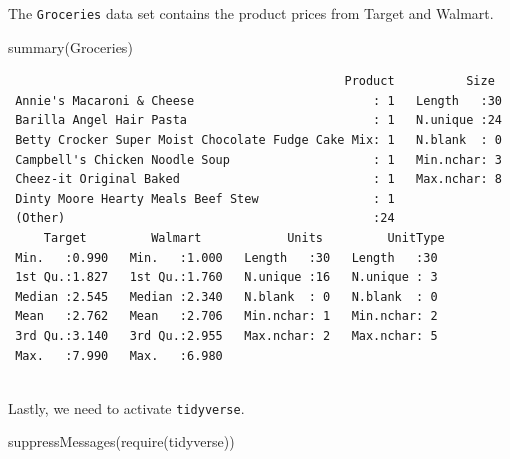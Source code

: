 \documentclass[
  letterpaper,
  DIV=11,
  numbers=noendperiod]{scrreprt}
\newenvironment{Shaded}{\begin{snugshade}}{\end{snugshade}}
\newcommand{\FunctionTok}[1]{\textcolor[rgb]{0.28,0.35,0.67}{#1}}
\newcommand{\NormalTok}[1]{\textcolor[rgb]{0.00,0.23,0.31}{#1}}
\newcommand{\OtherTok}[1]{\textcolor[rgb]{0.00,0.23,0.31}{#1}}
\newcommand{\SpecialCharTok}[1]{\textcolor[rgb]{0.37,0.37,0.37}{#1}}
\begin{document}
\begin{Shaded}
\end{Shaded}

The \texttt{Groceries} data set contains the product prices from Target
and Walmart.

\begin{Shaded}
\begin{Highlighting}[]
\FunctionTok{summary}\NormalTok{(Groceries)}
\end{Highlighting}
\end{Shaded}

\begin{verbatim}
                                               Product          Size   
 Annie's Macaroni & Cheese                         : 1   Length   :30  
 Barilla Angel Hair Pasta                          : 1   N.unique :24  
 Betty Crocker Super Moist Chocolate Fudge Cake Mix: 1   N.blank  : 0  
 Campbell's Chicken Noodle Soup                    : 1   Min.nchar: 3  
 Cheez-it Original Baked                           : 1   Max.nchar: 8  
 Dinty Moore Hearty Meals Beef Stew                : 1                 
 (Other)                                           :24                 
     Target         Walmart            Units         UnitType 
 Min.   :0.990   Min.   :1.000   Length   :30   Length   :30  
 1st Qu.:1.827   1st Qu.:1.760   N.unique :16   N.unique : 3  
 Median :2.545   Median :2.340   N.blank  : 0   N.blank  : 0  
 Mean   :2.762   Mean   :2.706   Min.nchar: 1   Min.nchar: 2  
 3rd Qu.:3.140   3rd Qu.:2.955   Max.nchar: 2   Max.nchar: 5  
 Max.   :7.990   Max.   :6.980                                
                                                              
\end{verbatim}

Lastly, we need to activate \texttt{tidyverse}.

\begin{Shaded}
\begin{Highlighting}[]
\FunctionTok{suppressMessages}\NormalTok{(}\FunctionTok{require}\NormalTok{(tidyverse))}
\end{Highlighting}
\end{Shaded}
\end{document}
